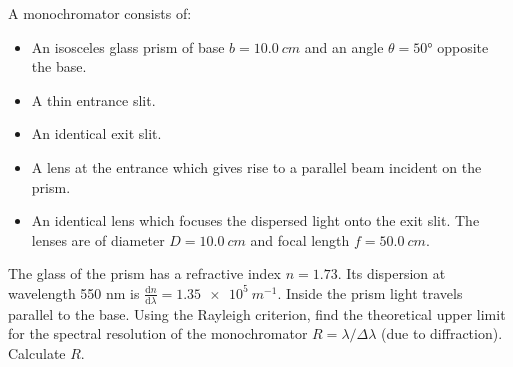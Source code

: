 \documentclass[../TST.tex]{subfiles}
\begin{document}
\begin{pproblem}
A monochromator consists of:
\begin{itemize}[nosep, label=--]
	\item An isosceles glass prism of base $b=\qty{10.0}{cm}$ and an angle $\theta=\ang{50}$ opposite the base.
	\item A thin entrance slit.
	\item An identical exit slit.
	\item A lens at the entrance which gives rise to a parallel beam incident on the prism.
	\item An identical lens which focuses the dispersed light onto the exit slit. The lenses are of diameter $D=\qty{10.0}{cm}$ and focal length $f=\qty{50.0}{cm}$.
\end{itemize}
The glass of the prism has a refractive index $n=1.73$. Its dispersion at wavelength 550 nm is $\frac{\mathrm{d}n}{\mathrm{d}\lambda}=\qty{1.35e5}{m^{-1}}$. Inside the prism light travels parallel to the base. Using the Rayleigh criterion, find the theoretical upper limit for the spectral resolution of the monochromator $R=\lambda/\Delta \lambda$ (due to diffraction). Calculate $R$.
\end{pproblem}
\end{document}

